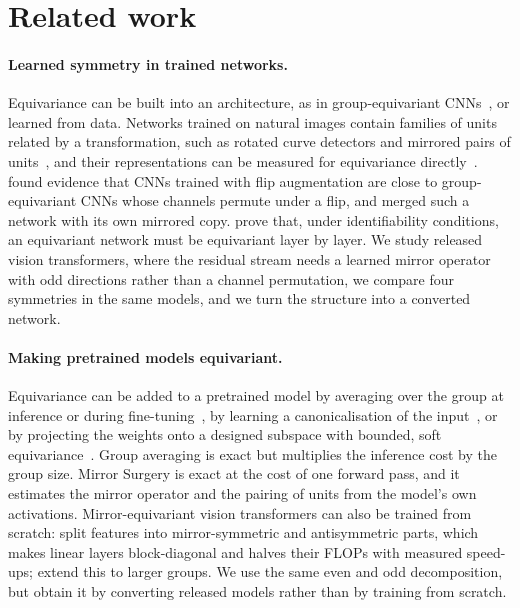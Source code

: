\section{Related work}
\label{sec:related}

\paragraph{Learned symmetry in trained networks.}
Equivariance can be built into an architecture, as in group-equivariant CNNs~\citep{cohen2016group}, or learned from
data. Networks trained on natural images contain families of units related by a transformation, such as rotated curve
detectors and mirrored pairs of units~\citep{olah2020naturally}, and their representations can be measured for
equivariance directly~\citep{lenc2015understanding,gruver2023lie}. \citet{bokman2023investigating} found evidence
that CNNs trained with flip augmentation are close to group-equivariant CNNs whose channels permute under a flip, and
merged such a network with its own mirrored copy. \citet{shahverdi2026identifiable} prove that, under identifiability
conditions, an equivariant network must be equivariant layer by layer. We study released vision transformers, where
the residual stream needs a learned mirror operator with odd directions rather than a channel permutation, we compare
four symmetries in the same models, and we turn the structure into a converted network.

\paragraph{Making pretrained models equivariant.}
Equivariance can be added to a pretrained model by averaging over the group at inference or during
fine-tuning~\citep{basu2023equi,basu2023efficient}, by learning a canonicalisation of the
input~\citep{kaba2023equivariance,mondal2023equivariant}, or by projecting the weights onto a designed subspace with
bounded, soft equivariance~\citep{rahman2026tunable}. Group averaging is exact but multiplies the inference cost by
the group size. Mirror Surgery is exact at the cost of one forward pass, and it estimates the mirror operator and the
pairing of units from the model's own activations. Mirror-equivariant vision transformers can also be trained from
scratch: \citet{bokman2025flopping} split features into mirror-symmetric and antisymmetric parts, which makes linear
layers block-diagonal and halves their FLOPs with measured speed-ups; \citet{nordstrom2025quick} extend this to larger
groups. We use the same even and odd decomposition, but obtain it by converting released models rather than by
training from scratch.

